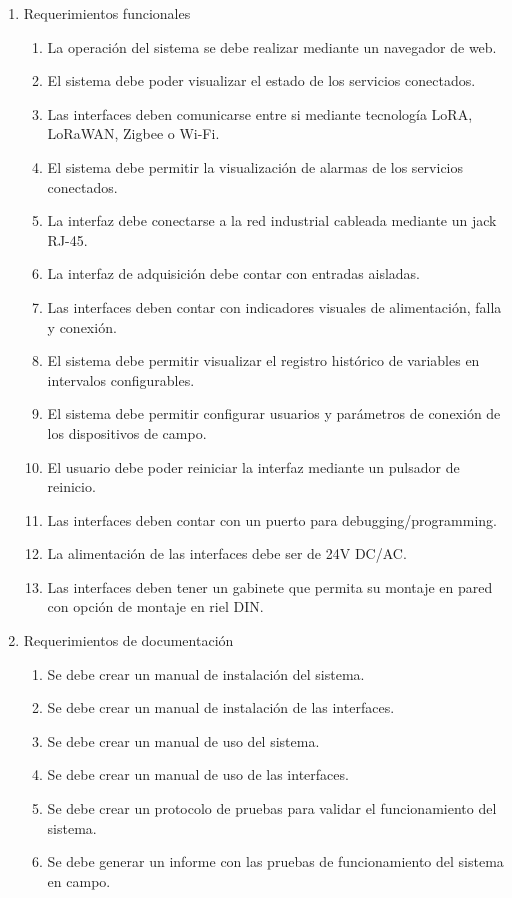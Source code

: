 \documentclass[
11pt, %
]{charter}
\begin{document}
\begin{enumerate}
	\item Requerimientos funcionales
		\begin{enumerate}
			\item La operación del sistema se debe realizar mediante un navegador de web.
			\item El sistema debe poder visualizar el estado de los servicios conectados.
			\item Las interfaces deben comunicarse entre si mediante tecnología LoRA, LoRaWAN, Zigbee o Wi-Fi.
			\item El sistema debe permitir la visualización de alarmas de los servicios conectados.
			\item La interfaz debe conectarse a la red industrial cableada mediante un jack RJ-45.
			\item La interfaz de adquisición debe contar con entradas aisladas.
			\item Las interfaces deben contar con indicadores visuales de alimentación, falla y conexión.
			\item El sistema debe permitir visualizar el registro histórico de variables en intervalos configurables. 
			\item El sistema debe permitir configurar usuarios y parámetros de conexión de los dispositivos de campo.
			\item El usuario debe poder reiniciar la interfaz mediante un pulsador de reinicio.
		    \item Las interfaces deben contar con un puerto para debugging/programming.
		    \item La alimentación de las interfaces debe ser de 24V DC/AC.
		    \item Las interfaces deben tener un gabinete que permita su montaje en pared con opción de montaje en riel DIN.
		\end{enumerate}

	\item Requerimientos de documentación
		\begin{enumerate}
			\item Se debe crear un manual de instalación del sistema.
			\item Se debe crear un manual de instalación de las interfaces.
			\item Se debe crear un manual de uso del sistema.
			\item Se debe crear un manual de uso de las interfaces.
			\item Se debe crear un protocolo de pruebas para validar el funcionamiento del sistema.
			\item Se debe generar un informe con las pruebas de funcionamiento del sistema en campo.

		\end{enumerate}
\end{enumerate}
\end{document}
